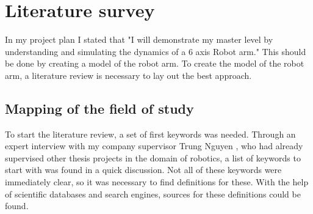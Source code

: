 \chapter{Literature survey}

In my project plan I stated that "I will demonstrate my master level by understanding and simulating the dynamics of a 6 axis Robot arm."\cite{ProjectPlan}
This should be done by creating a model of the robot arm. 
To create the model of the robot arm, a literature review is necessary to lay out the best approach.\\
\medskip

\section{Mapping of the field of study}

To start the literature review, a set of first keywords was needed. Through an expert interview with my company supervisor Trung Nguyen \cite{Trung} , who had already supervised other thesis projects in the domain of robotics, a list of keywords to start with was found in a quick discussion. Not all of these keywords were immediately clear, so it was necessary to find definitions for these. With the help of scientific databases and search engines, sources for these definitions could be found.\\




